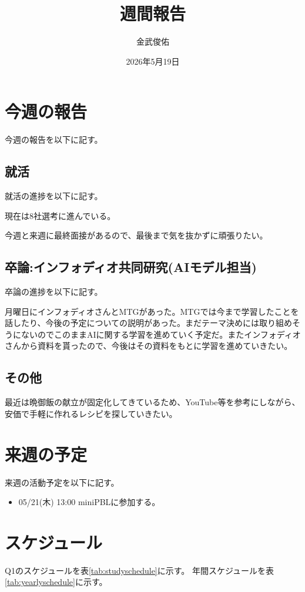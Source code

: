 \documentclass[a4paper,12pt]{ujarticle}
\title{週間報告}
\author{金武俊佑}
\date{2026年5月19日}
\begin{document}
\maketitle

\section{今週の報告}\label{sec:thisweek}
今週の報告を以下に記す。

\subsection{就活}\label{sec:job}
就活の進捗を以下に記す。


現在は8社選考に進んでいる。


今週と来週に最終面接があるので、最後まで気を抜かずに頑張りたい。
\subsection{卒論:インフォディオ共同研究(AIモデル担当)}\label{sec:thesis}
卒論の進捗を以下に記す。


月曜日にインフォディオさんとMTGがあった。MTGでは今まで学習したことを話したり、今後の予定についての説明があった。まだテーマ決めには取り組めそうにないのでこのままAIに関する学習を進めていく予定だ。またインフォディオさんから資料を貰ったので、今後はその資料をもとに学習を進めていきたい。

\subsection{その他}\label{sec:other}
最近は晩御飯の献立が固定化してきているため、YouTube等を参考にしながら、安価で手軽に作れるレシピを探していきたい。
\section{来週の予定}\label{sec:nextweek}
来週の活動予定を以下に記す。
\begin{itemize}
  \item 05/21(木) 13:00 miniPBLに参加する。
\end{itemize}


\section{スケジュール}\label{sec:schedule}
Q1のスケジュールを表\ref{tab:studyschedule}に示す。
年間スケジュールを表\ref{tab:yearlyschedule}に示す。
\end{document}
